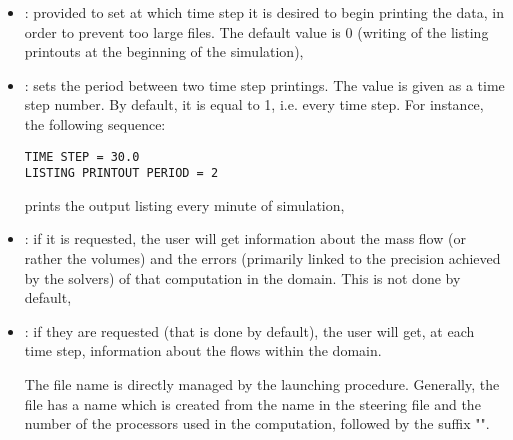 \begin{itemize}

\item {}: provided to set at
which time step it is desired to begin printing the data, in order to prevent
too large files.
The default value is 0 (writing of the listing printouts at the
beginning of the simulation),

\item {}: sets the period between two time step
printings. The value is given as a time step number.
By default, it is equal to 1, i.e. every time step.
For instance, the following sequence:

\begin{lstlisting}[language=TelemacCas]
TIME STEP = 30.0
LISTING PRINTOUT PERIOD = 2
\end{lstlisting}

prints the output listing every minute of simulation,

\item {}: if it is requested, the user will get
information about the mass flow (or rather the volumes) and the errors
(primarily linked to the precision achieved by the solvers) of that computation
in the domain. This is not done by default,

\item {}: if they are
requested (that is done by default), the user will get, at each time step,
information about the flows within the domain.

The file name is directly managed by the  launching procedure.
Generally, the file has a name which is created from the name in the steering
file and the number of the processors used in the computation, followed by the
suffix "".

\end{itemize}

%
%
%
